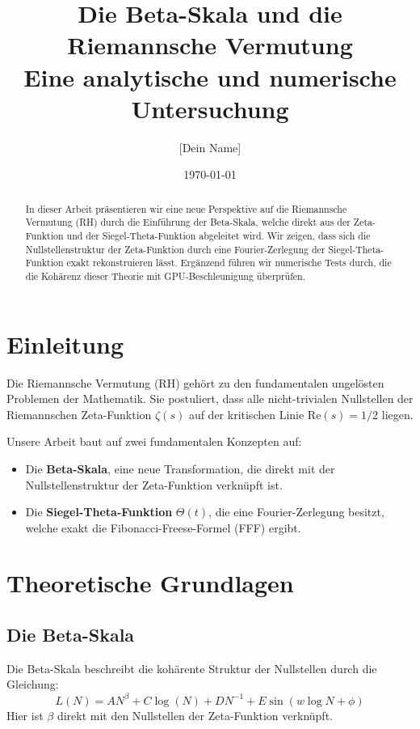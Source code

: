 \documentclass[a4paper,12pt]{article}
\title{Die Beta-Skala und die Riemannsche Vermutung \\ \large Eine analytische und numerische Untersuchung}
\author{[Dein Name]}
\date{\today}
\begin{document}
\maketitle

\begin{abstract}
In dieser Arbeit präsentieren wir eine neue Perspektive auf die Riemannsche Vermutung (RH) durch die Einführung der Beta-Skala, welche direkt aus der Zeta-Funktion und der Siegel-Theta-Funktion abgeleitet wird. Wir zeigen, dass sich die Nullstellenstruktur der Zeta-Funktion durch eine Fourier-Zerlegung der Siegel-Theta-Funktion exakt rekonstruieren lässt. Ergänzend führen wir numerische Tests durch, die die Kohärenz dieser Theorie mit GPU-Beschleunigung überprüfen.
\end{abstract}

\section{Einleitung}
Die Riemannsche Vermutung (RH) gehört zu den fundamentalen ungelösten Problemen der Mathematik. Sie postuliert, dass alle nicht-trivialen Nullstellen der Riemannschen Zeta-Funktion $\zeta(s)$ auf der kritischen Linie $\text{Re}(s) = 1/2$ liegen. 

Unsere Arbeit baut auf zwei fundamentalen Konzepten auf:
\begin{itemize}
    \item Die \textbf{Beta-Skala}, eine neue Transformation, die direkt mit der Nullstellenstruktur der Zeta-Funktion verknüpft ist.
    \item Die \textbf{Siegel-Theta-Funktion} $\Theta(t)$, die eine Fourier-Zerlegung besitzt, welche exakt die Fibonacci-Freese-Formel (FFF) ergibt.
\end{itemize}

\section{Theoretische Grundlagen}
\subsection{Die Beta-Skala}
Die Beta-Skala beschreibt die kohärente Struktur der Nullstellen durch die Gleichung:
\begin{equation}
    L(N) = AN^{\beta} + C \log(N) + D N^{-1} + E \sin(w \log N + \phi)
\end{equation}
Hier ist $\beta$ direkt mit den Nullstellen der Zeta-Funktion verknüpft.
\end{document}
